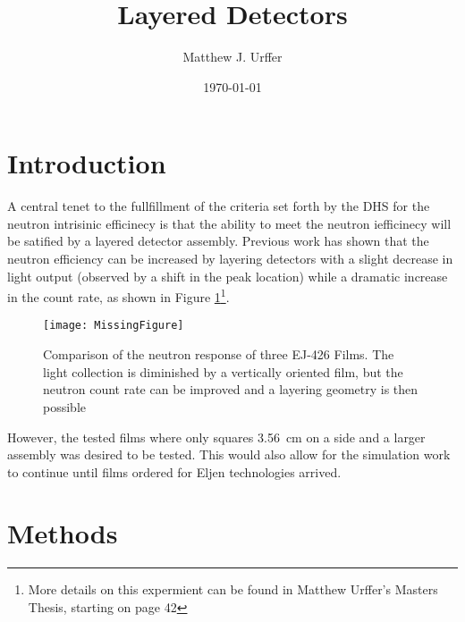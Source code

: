 \documentclass[draftcls,onecolumn]{IEEEtran}
\begin{document}
\title{Layered Detectors}
\author{Matthew J. Urffer}
\date{\today}
\maketitle


\listoftodos
\tableofcontents
\listoffigures
\listoftables
\lstlistoflistings
\section{Introduction}
A central tenet to the fullfillment of the criteria set forth by the DHS for the neutron intrisinic efficinecy is that the ability to meet the neutron iefficinecy will be satified by a layered detector assembly.
Previous work has shown that the neutron efficiency can be increased by layering detectors with a slight decrease in light output (observed by a shift in the peak location) while a dramatic increase in the count rate, as shown in Figure \ref{fig:SmallLayeredEJ426}\footnote{More details on this expermient can be found in Matthew Urffer's Masters Thesis, starting on page 42}.
\begin{figure}
  \centering
  \texttt{[image: MissingFigure]}
  \label{fig:SmallLayeredEJ426}
  \caption[Neutron Response of EJ426 HD2 Films oriented vertically and horzitonaly]{Comparison of the neutron response of three EJ-426 Films. The light collection is diminished by a vertically oriented film, but the neutron count rate can be improved and a layering geometry is then possible}
\end{figure}
However, the tested films where only squares \SI{3.56}{\cm} on a side and a larger assembly was desired to be tested.
This would also allow for the simulation work to continue until films ordered for Eljen technologies arrived.

\section{Methods}
\end{document}
